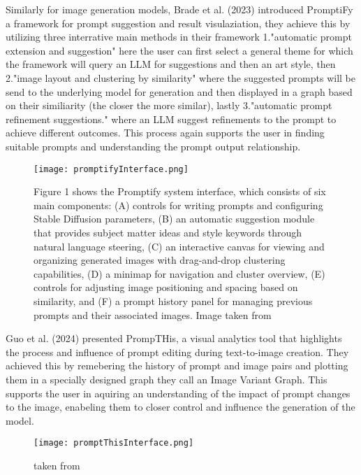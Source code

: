 \documentclass[
  a4paper,  %
  twoside,  %
  bibliography=totoc,
  headsepline,
  cleardoublepage=empty,
  parskip=half,
  draft=false
]{scrbook}
\begin{document}
Similarly for image generation models, Brade et al. (2023) \cite{brade2023promptifytexttoimagegenerationinteractive} introduced PromptiFy a framework for prompt suggestion and result visulaziation, they achieve this by utilizing three interrative main methods in their framework 1."automatic prompt extension and suggestion" here the user can first select a general theme for which the framework will query an LLM for suggestions and then an art style, then 2."image layout and clustering by similarity" where the suggested prompts will be send to the underlying model for generation and then displayed in a graph based on their similiarity (the closer the more similar), lastly
 3."automatic prompt refinement suggestions." where an LLM suggest refinements to the prompt to achieve different outcomes. 
 This process again supports the user in finding suitable prompts and understanding the prompt output relationship.\\
  \begin{figure}[H]
	\centering
	\texttt{[image: promptifyInterface.png]}
	\caption{ Figure 1 shows the Promptify system interface, which consists of six main components: (A) controls for writing prompts and configuring Stable Diffusion parameters, (B) an automatic suggestion module that provides subject matter ideas and style keywords through natural language steering, (C) an interactive canvas for viewing and organizing generated images with drag-and-drop clustering capabilities, (D) a minimap for navigation and cluster overview, (E) controls for adjusting image positioning and spacing based on similarity, and (F) a prompt history panel for managing previous prompts and their associated images. Image taken from \cite{mishra2025promptaidpromptexplorationperturbation}}
	\label{fig:promptify}
\end{figure}


 Guo et al. (2024) \cite{guo2024prompthisvisualizingprocessinfluence} presented PrompTHis, a visual analytics tool that highlights the process and influence of prompt editing during text-to-image creation. They achieved this by remebering the history of prompt and image pairs and plotting them in a specially designed graph they call an Image Variant Graph. This supports the user in aquiring an understanding of the impact of prompt changes to the image, enabeling them to closer control and influence the generation of the model.\\
 
  \begin{figure}[H]
 	\centering
 	\texttt{[image: promptThisInterface.png]}
 	\caption{ taken from \cite{guo2024prompthisvisualizingprocessinfluence}}
 	\label{fig:promptThis}
 \end{figure}
 
\end{document}
